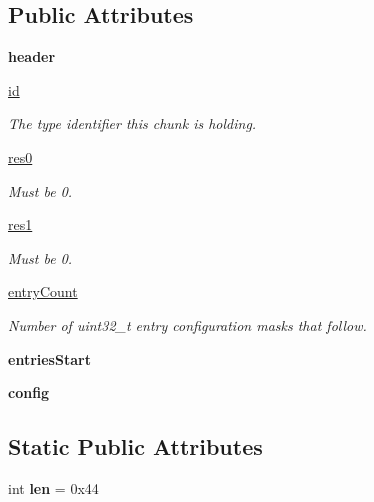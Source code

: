 \subsection*{Public Attributes}
\begin{DoxyCompactItemize}
\item 
\mbox{\label{classarsc_1_1tabletype_1_1ResTable__type__header_a606e6bcdf47457963f737e46ff7fbf93}} 
{\bfseries header}
\item 
\mbox{\hyperlink{classarsc_1_1tabletype_1_1ResTable__type__header_abef8272ec94fa03d9c4e172581d65e40}{id}}
\begin{DoxyCompactList}\small\item\em The type identifier this chunk is holding. \end{DoxyCompactList}\item 
\mbox{\hyperlink{classarsc_1_1tabletype_1_1ResTable__type__header_a7f7636b7613e62a763247aa807bbeb6c}{res0}}
\begin{DoxyCompactList}\small\item\em Must be 0. \end{DoxyCompactList}\item 
\mbox{\hyperlink{classarsc_1_1tabletype_1_1ResTable__type__header_ab67ee6048e79cef10c45b4d619f515d9}{res1}}
\begin{DoxyCompactList}\small\item\em Must be 0. \end{DoxyCompactList}\item 
\mbox{\hyperlink{classarsc_1_1tabletype_1_1ResTable__type__header_aaf33c49ce80c953b5040683ba2f887ab}{entry\+Count}}
\begin{DoxyCompactList}\small\item\em Number of uint32\+\_\+t entry configuration masks that follow. \end{DoxyCompactList}\item 
\mbox{\label{classarsc_1_1tabletype_1_1ResTable__type__header_a6af2183b9ab3d5330877d13c54e3dd8d}} 
{\bfseries entries\+Start}
\item 
\mbox{\label{classarsc_1_1tabletype_1_1ResTable__type__header_a765a5f99e9d26e809047189df31f026a}} 
{\bfseries config}
\end{DoxyCompactItemize}
\subsection*{Static Public Attributes}
\begin{DoxyCompactItemize}
\item 
\mbox{\label{classarsc_1_1tabletype_1_1ResTable__type__header_abdd044774e163d607330dceb61c01e8f}} 
int {\bfseries len} = 0x44
\end{DoxyCompactItemize}


